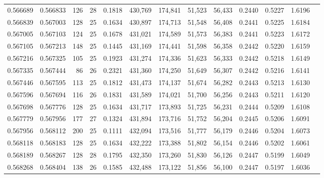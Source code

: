 \begin{tabular}{rrrrrrrrrrrrr}
0.566689 & 0.566833 &   126 &  28 &                                     0.1818 & 430,769 & 174,841 &  51,523 &  56,433 & 0.2440 & 0.5227 & 1.6196 \\
0.566839 & 0.567003 &   128 &  25 &                                     0.1634 & 430,897 & 174,713 &  51,548 &  56,408 & 0.2441 & 0.5225 & 1.6184 \\
0.567005 & 0.567103 &   124 &  25 &                                     0.1678 & 431,021 & 174,589 &  51,573 &  56,383 & 0.2441 & 0.5223 & 1.6172 \\
0.567105 & 0.567213 &   148 &  25 &                                     0.1445 & 431,169 & 174,441 &  51,598 &  56,358 & 0.2442 & 0.5220 & 1.6159 \\
0.567216 & 0.567325 &   105 &  25 &                                     0.1923 & 431,274 & 174,336 &  51,623 &  56,333 & 0.2442 & 0.5218 & 1.6149 \\
0.567335 & 0.567444 &    86 &  26 &                                     0.2321 & 431,360 & 174,250 &  51,649 &  56,307 & 0.2442 & 0.5216 & 1.6141 \\
0.567446 & 0.567595 &   113 &  25 &                                     0.1812 & 431,473 & 174,137 &  51,674 &  56,282 & 0.2443 & 0.5213 & 1.6130 \\
0.567596 & 0.567694 &   116 &  26 &                                     0.1831 & 431,589 & 174,021 &  51,700 &  56,256 & 0.2443 & 0.5211 & 1.6120 \\
0.567698 & 0.567776 &   128 &  25 &                                     0.1634 & 431,717 & 173,893 &  51,725 &  56,231 & 0.2444 & 0.5209 & 1.6108 \\
0.567779 & 0.567956 &   177 &  27 &                                     0.1324 & 431,894 & 173,716 &  51,752 &  56,204 & 0.2445 & 0.5206 & 1.6091 \\
0.567956 & 0.568112 &   200 &  25 &                                     0.1111 & 432,094 & 173,516 &  51,777 &  56,179 & 0.2446 & 0.5204 & 1.6073 \\
0.568118 & 0.568183 &   128 &  25 &                                     0.1634 & 432,222 & 173,388 &  51,802 &  56,154 & 0.2446 & 0.5202 & 1.6061 \\
0.568189 & 0.568267 &   128 &  28 &                                     0.1795 & 432,350 & 173,260 &  51,830 &  56,126 & 0.2447 & 0.5199 & 1.6049 \\
0.568268 & 0.568404 &   138 &  26 &                                     0.1585 & 432,488 & 173,122 &  51,856 &  56,100 & 0.2447 & 0.5197 & 1.6036 \\

\end{tabular}
